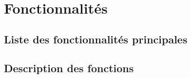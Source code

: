 \section{Fonctionnalités}
\subsection{Liste des fonctionnalités principales}
\subsection{Description des fonctions}
\decrireFonctionPrincipal


